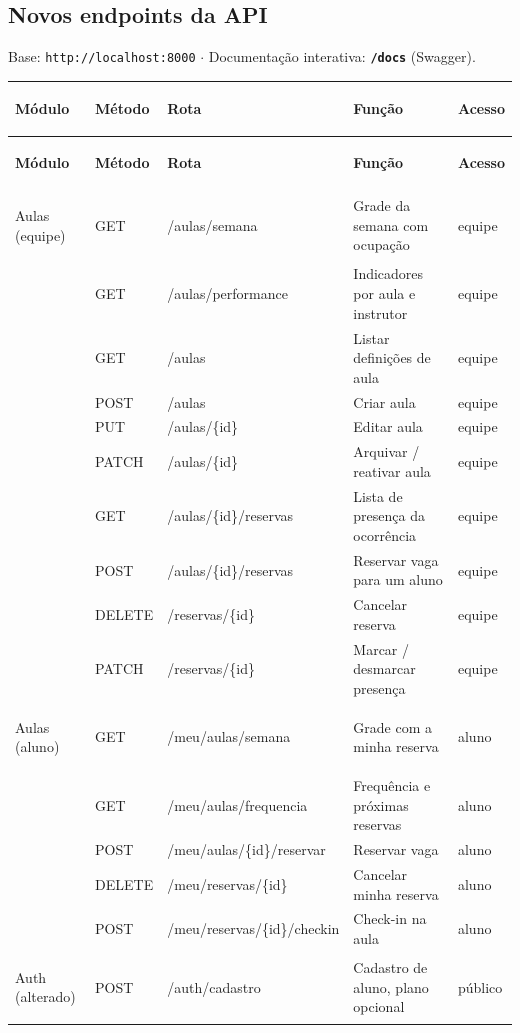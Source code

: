 \documentclass[11pt,a4paper]{article}
\newcommand{\cod}[1]{\texttt{#1}}
\begin{document}
\subsection{Novos endpoints da API}

Base: \cod{http://localhost:8000} $\cdot$ Documentação interativa: \textbf{\cod{/docs}} (Swagger).

{\small
\begin{xltabular}{\textwidth}{>{\bfseries\raggedright\arraybackslash}p{2.0cm} R{1.5cm} >{\ttfamily\raggedright\arraybackslash}p{4.6cm} Y R{2.2cm}}
  \toprule
  \normalfont\bfseries Módulo & \textbf{Método} & \normalfont\bfseries Rota & \textbf{Função} & \textbf{Acesso} \\
  \midrule
  \endfirsthead
  \toprule
  \normalfont\bfseries Módulo & \textbf{Método} & \normalfont\bfseries Rota & \textbf{Função} & \textbf{Acesso} \\
  \midrule
  \endhead
  \bottomrule
  \endfoot
  Aulas (equipe) & GET   & /aulas/semana              & Grade da semana com ocupação       & equipe \\
                 & GET   & /aulas/performance         & Indicadores por aula e instrutor   & equipe \\
                 & GET   & /aulas                     & Listar definições de aula          & equipe \\
                 & POST  & /aulas                     & Criar aula                         & equipe \\
                 & PUT   & /aulas/\{id\}              & Editar aula                        & equipe \\
                 & PATCH & /aulas/\{id\}              & Arquivar / reativar aula           & equipe \\
                 & GET   & /aulas/\{id\}/reservas     & Lista de presença da ocorrência    & equipe \\
                 & POST  & /aulas/\{id\}/reservas     & Reservar vaga para um aluno        & equipe \\
                 & DELETE & /reservas/\{id\}          & Cancelar reserva                   & equipe \\
                 & PATCH & /reservas/\{id\}           & Marcar / desmarcar presença        & equipe \\
  \midrule
  Aulas (aluno)  & GET   & /meu/aulas/semana          & Grade com a minha reserva          & aluno \\
                 & GET   & /meu/aulas/frequencia      & Frequência e próximas reservas     & aluno \\
                 & POST  & /meu/aulas/\{id\}/reservar & Reservar vaga                      & aluno \\
                 & DELETE & /meu/reservas/\{id\}      & Cancelar minha reserva             & aluno \\
                 & POST  & /meu/reservas/\{id\}/checkin & Check-in na aula                 & aluno \\
  \midrule
  Auth (alterado) & POST & /auth/cadastro             & Cadastro de aluno, plano opcional  & público \\
\end{xltabular}
}
\end{document}
